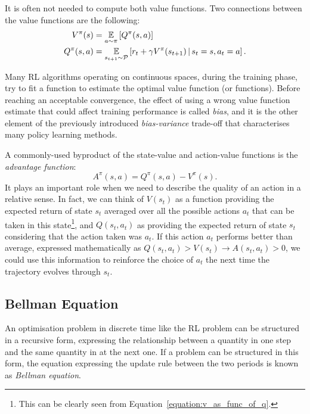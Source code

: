 It is often not needed to compute both value functions.
Two connections between the value functions are the following:
%
\begin{align}
    V^\pi(s) &= \operatorname*{\mathbb{E}}_{a \sim \pi} \left[ Q^\pi(s, a) \right] \label{equation:v_as_func_of_q}\\
    Q^\pi(s, a) &= \operatorname*{\mathbb{E}}_{s_{t+1} \sim \mathcal{P}} \left[ r_t + \gamma V^\pi(s_{t+1}) \operatorname{\mid} s_t=s, a_t=a \right] \label{equation:q_as_func_of_v}
    .
\end{align}

\begin{remark*}
\label{remark:bias_in_biasvariance}
%
Many \ac{RL} algorithms operating on continuous spaces, during the training phase, try to fit a function to estimate the optimal value function (or functions).
Before reaching an acceptable convergence, the effect of using a wrong value function estimate that could affect training performance is called \emph{bias}, and it is the other element of the previously introduced \emph{bias-variance} trade-off that characterises many policy learning methods.
%
\end{remark*}

A commonly-used byproduct of the state-value and action-value functions is the \emph{advantage function}:
%
\begin{equation}
    \label{equation:advantage_function}
    A^\pi(s, a) = Q^\pi(s, a) - V^\pi(s) .
\end{equation}
%
It plays an important role when we need to describe the quality of an action in a relative sense.
In fact, we can think of $V(s_t)$ as a function providing the expected return of state $s_t$ averaged over all the possible actions $a_t$ that can be taken in this state\footnote{This can be clearly seen from Equation~\eqref{equation:v_as_func_of_q}.}, and $Q(s_t, a_t)$ as providing the expected return of state $s_t$ considering that the action taken was $a_t$.
If this action $a_t$ performs better than average, expressed mathematically as $Q(s_t, a_t) > V(s_t) \rightarrow A(s_t, a_t) > 0$, we could use this information to reinforce the choice of $a_t$ the next time the trajectory evolves through $s_t$.

\subsection{Bellman Equation}
\label{section:bellman_equation}

An optimisation problem in discrete time like the \ac{RL} problem can be structured in a recursive form, \ie expressing the relationship between a quantity in one step and the same quantity in at the next one.
If a problem can be structured in this form, the equation expressing the update rule between the two periods is known as \emph{Bellman equation}.

